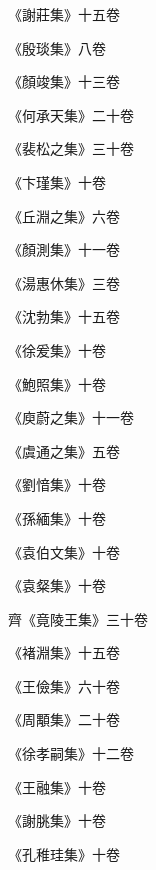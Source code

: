 \begin{pinyinscope}
 《謝莊集》十五卷



 《殷琰集》八卷



 《顏竣集》十三卷



 《何承天集》二十卷



 《裴松之集》三十卷



 《卞瑾集》十卷



 《丘淵之集》六卷



 《顏測集》十一卷



 《湯惠休集》三卷



 《沈勃集》十五卷



 《徐爰集》十卷



 《鮑照集》十卷



 《庾蔚之集》十一卷



 《虞通之集》五卷



 《劉愔集》十卷



 《孫緬集》十卷



 《袁伯文集》十卷



 《袁粲集》十卷



 齊《竟陵王集》三十卷



 《褚淵集》十五卷



 《王儉集》六十卷



 《周顒集》二十卷



 《徐孝嗣集》十二卷



 《王融集》十卷



 《謝朓集》十卷



 《孔稚珪集》十卷




\end{pinyinscope}
